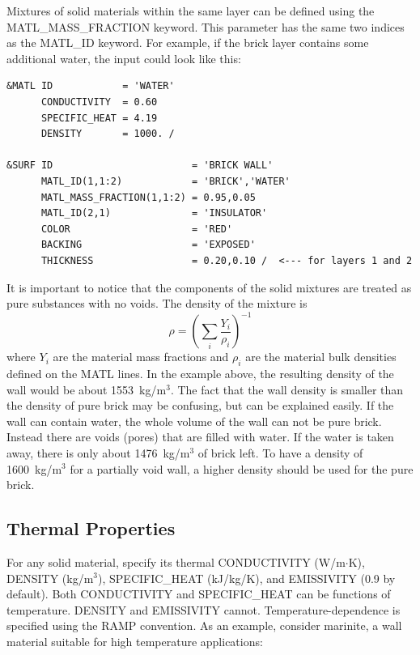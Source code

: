 \documentclass[11pt]{book}
\newcommand{\be}{\begin{equation}}
\newcommand{\ee}{\end{equation}}
\begin{document}
Mixtures of solid materials within the same layer can be defined using
the {\ct MATL\_MASS\_FRACTION} keyword. This parameter has the same two indices as the {\ct MATL\_ID} keyword. For example, if the
brick layer contains some additional water, the input could look like this:

\footnotesize
\begin{verbatim}
&MATL ID            = 'WATER'
      CONDUCTIVITY  = 0.60
      SPECIFIC_HEAT = 4.19
      DENSITY       = 1000. /

&SURF ID                        = 'BRICK WALL'
      MATL_ID(1,1:2)            = 'BRICK','WATER'
      MATL_MASS_FRACTION(1,1:2) = 0.95,0.05
      MATL_ID(2,1)              = 'INSULATOR'
      COLOR                     = 'RED'
      BACKING                   = 'EXPOSED'
      THICKNESS                 = 0.20,0.10 /  <--- for layers 1 and 2

\end{verbatim}
\normalsize
\noindent
It is important to notice that the components of the solid mixtures
are treated as pure substances with no voids. The density of the
mixture is
\be
\rho = \left(\sum_i\frac{Y_i}{\rho_i}\right)^{-1}
\ee
where $Y_i$ are the material mass fractions and $\rho_i$ are the
material bulk densities defined on the {\ct MATL} lines. In the
example above, the resulting density of the wall would be about
1553~kg/m$^3$. The fact that the wall density is smaller than the
density of pure brick may be confusing, but can be explained easily.
If the wall can contain water, the whole volume of the wall can not be
pure brick. Instead there are voids (pores) that are
filled with water. If the water is taken away, there is only about
1476~kg/m$^3$ of brick left. To have a density of 1600~kg/m$^3$ for a
partially void wall, a higher density should be used for the pure
brick.


\subsection{Thermal Properties}

For any solid material, specify its thermal
{\ct CONDUCTIVITY} (W/m$\cdot$K), {\ct DENSITY} (kg/m$^3$),
{\ct SPECIFIC\_HEAT} (kJ/kg/K), and {\ct EMISSIVITY} (0.9 by default).
Both {\ct CONDUCTIVITY} and {\ct SPECIFIC\_HEAT} can be functions of
temperature. {\ct DENSITY} and {\ct EMISSIVITY} cannot.
Temperature-dependence is specified using the {\ct RAMP} convention.
As an example, consider marinite, a wall material suitable for high temperature applications:
\end{document}
